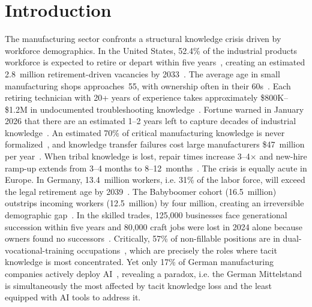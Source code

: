 \documentclass[]{ceurart}
\begin{document}
\maketitle

\section{Introduction}\label{sec:intro}

The manufacturing sector confronts a structural knowledge crisis driven
by workforce demographics. In the United States, 52.4\% of the
industrial products workforce is expected to retire or depart within
five years~\cite{apqc2025}, creating an estimated 2.8~million
retirement-driven vacancies by 2033~\cite{deloitte2024}. The average age
in small manufacturing shops approaches~55, with ownership often in
their 60s~\cite{edwards2026}. Each retiring technician with 20+ years of
experience takes approximately \$800K--\$1.2M in undocumented
troubleshooting knowledge~\cite{dovient2025}. Fortune warned in
January 2026 that there are an estimated 1--2 years left to capture
decades of industrial knowledge~\cite{fortune2026}. An estimated 70\% of
critical manufacturing knowledge is never
formalized~\cite{egain2025}, and knowledge transfer failures cost large
manufacturers \$47~million per year~\cite{panopto2018}. When tribal
knowledge is lost, repair times increase 3--4$\times$ and new-hire
ramp-up extends from 3--4 months to 8--12~months~\cite{dovient2025}. The crisis is equally acute in Europe. In Germany, 13.4~million
workers, i.e. 31\% of the labor force, will exceed the legal retirement age
by 2039~\cite{destatis2025}. The Babyboomer cohort (16.5~million)
outstrips incoming workers (12.5~million) by four million, creating an
irreversible demographic gap~\cite{iwkoeln2025}. In the skilled trades, 125,000 businesses face generational succession
within five years and 80,000 craft jobs were lost in 2024 alone because
owners found no successors~\cite{zdh2025}. Critically, 57\% of non-fillable positions are in
dual-vocational-training occupations~\cite{dihk2025}, which are precisely the roles where tacit
knowledge is most concentrated. Yet only 17\% of German manufacturing
companies actively deploy AI~\cite{bitkom2026}, revealing a paradox, i.e. the
German Mittelstand is simultaneously the most affected by tacit knowledge
loss and the least equipped with AI tools to address it.
\end{document}
